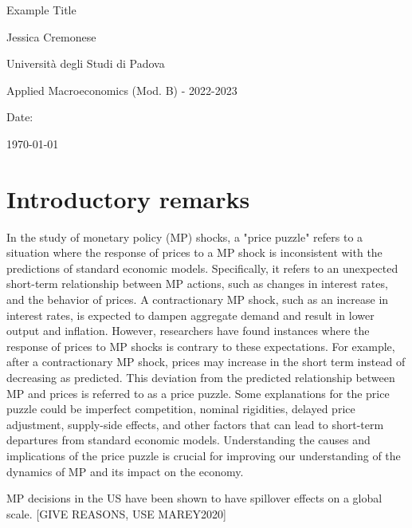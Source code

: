 \documentclass[10pt,a4paper,draft]{article}
\begin{document}
\begin{titlepage}
    \centering
    \vspace*{2cm}
    {\LARGE Example Title \par}
    \vspace{2cm}
    {\large Jessica Cremonese \par}
    \vspace{1cm}
    {\large Università degli Studi di Padova \par}
    \vspace{1cm}
    {\large Applied Macroeconomics (Mod. B) - 2022-2023 \par}
    \vspace{1cm}
    {\large Date: \par}
    {\large \today \par}
\end{titlepage}


\newpage
\section{Introductory remarks}

In the study of monetary policy (MP) shocks, a "price puzzle" refers to a situation where the response of prices to a MP shock is inconsistent with the predictions of standard economic models. Specifically, it refers to an unexpected short-term relationship between MP actions, such as changes in interest rates, and the behavior of prices. A contractionary MP shock, such as an increase in interest rates, is expected to dampen aggregate demand and result in lower output and inflation. However, researchers have found instances where the response of prices to MP shocks is contrary to these expectations. For example, after a contractionary MP shock, prices may increase in the short term instead of decreasing as predicted. This deviation from the predicted relationship between MP and prices is referred to as a price puzzle. Some explanations for the price puzzle could be imperfect competition, nominal rigidities, delayed price adjustment, supply-side effects, and other factors that can lead to short-term departures from standard economic models. Understanding the causes and implications of the price puzzle is crucial for improving our understanding of the dynamics of MP and its impact on the economy.


MP decisions in the US have been shown to have spillover effects on a global scale. [GIVE REASONS, USE MAREY2020] 
\end{document}
